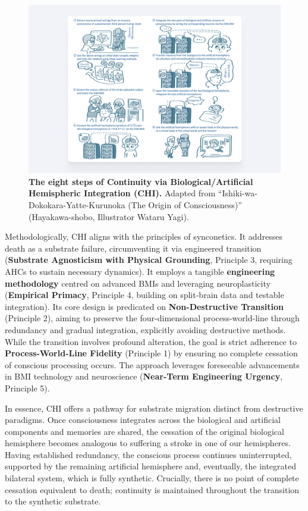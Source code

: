 \documentclass[10pt]{article}
\begin{document}
\begin{sloppypar}
  \begin{figure}[ht!]
    \centering
    \includegraphics[width=\textwidth]{figures/masa-approach-3.png}
    \caption[CHI: The eight steps of Continuity via Biological/Artificial Hemispheric Integration]{\textbf{The eight steps of Continuity via Biological/Artificial Hemispheric Integration (CHI).} Adapted from “Ishiki-wa-Dokokara-Yatte-Kurunoka (The Origin of Consciousness)” (Hayakawa-shobo, Illustrator Wataru Yagi).}
    \label{fig:masa-approach-3}
  \end{figure}

  Methodologically, CHI aligns with the principles of synconetics. It addresses death as a substrate failure, circumventing it via engineered transition (\textbf{Substrate Agnosticism with Physical Grounding}, Principle 3, requiring AHCs to sustain necessary dynamics). It employs a tangible \textbf{engineering methodology} centred on advanced BMIs and leveraging neuroplasticity (\textbf{Empirical Primacy}, Principle 4, building on split-brain data and testable integration). Its core design is predicated on \textbf{Non-Destructive Transition} (Principle 2), aiming to preserve the four-dimensional process-world-line through redundancy and gradual integration, explicitly avoiding destructive methods. While the transition involves profound alteration, the goal is strict adherence to \textbf{Process-World-Line Fidelity} (Principle 1) by ensuring no complete cessation of conscious processing occurs. The approach leverages foreseeable advancements in BMI technology and neuroscience (\textbf{Near-Term Engineering Urgency}, Principle 5).

  In essence, CHI offers a pathway for substrate migration distinct from destructive paradigms. Once consciousness integrates across the biological and artificial components and memories are shared, the cessation of the original biological hemisphere becomes analogous to suffering a stroke in one of our hemispheres. Having established redundancy, the conscious process continues uninterrupted, supported by the remaining artificial hemisphere and, eventually, the integrated bilateral system, which is fully synthetic. Crucially, there is no point of complete cessation equivalent to death; continuity is maintained throughout the transition to the synthetic substrate.


\end{sloppypar}
\end{document}
